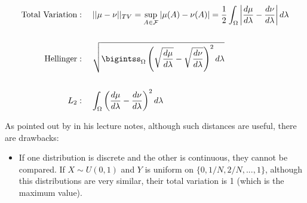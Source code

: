 \documentclass[10pt]{article}
\begin{document}
\begin{align*} 
\text{Total Variation} &: \quad || \mu - \nu ||_{TV} =
\sup_{A \in \mathcal F} |\mu (A) - \nu(A)| = 
\frac{1}{2}\int_\Omega \left | \frac{d\mu}{d\lambda} - \frac{d\nu}{d\lambda} \right
|d\lambda \\
\\
\text{Hellinger} &: \quad \sqrt{\bigintss_\Omega \left(\sqrt{\frac{d\mu}{d\lambda}} -
\sqrt{\frac{d\nu}{d\lambda}} \right )^2d\lambda} \\
\\
L_2 &: \quad \int_\Omega \left(\frac{d\mu}{d\lambda} - \frac{d\nu}{d\lambda}\right)^2
d\lambda \\
\end{align*}

As pointed out by \citet{wassermanStatisicalMethods2018} in his lecture notes,
although such distances are useful, there are drawbacks:
\begin{itemize}
	\item If one distribution is discrete and the other is continuous,  they cannot
	be compared. If $X \sim U(0,1)$ and $Y$ is uniform on $\{0,1/N, 2/N,...,1\}$,
	although this distributions are very similar, their total variation is 1 (which is
	the maximum value).
\end{itemize}
	





 
\end{document}
